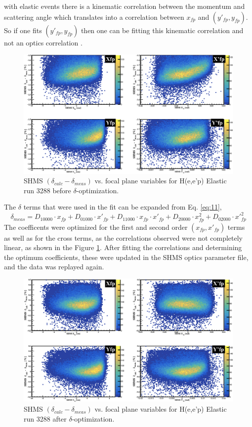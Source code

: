 \documentclass[11pt]{article}
\begin{document}
with elastic events there is a kinematic correlation between the momentum and scattering angle which translates into a correlation
between $x_{fp}$ and $(y'_{fp}, y_{fp})$. So if one fits $(y'_{fp}, y_{fp})$ then one can be fitting this kinematic
correlation and not an optics correlation \cite{priv_comm}.
\begin{figure}[h!]
  \centering
  \includegraphics[scale=0.34]{plots/SHMS_DeltaDiff_BeforeOptim3288.png}
  \caption{SHMS $(\delta_{calc}-\delta_{meas})$ vs. focal plane variables for H(e,e'p) Elastic run 3288 before $\delta$-optimization.}
  \label{fig:shmsDelta_beforeOptim}
\end{figure}
\newpage
\indent The $\delta$ terms that were used in the fit can be expanded from Eq. \ref{eq:11},
\begin{equation}
  \delta_{meas} = D_{10000}\cdot x_{fp} + D_{01000}\cdot x'_{fp} + D_{11000}\cdot x_{fp}\cdot x'_{fp} + D_{20000}\cdot x^{2}_{fp} + D_{02000}\cdot x'^{2}_{fp}
\end{equation}
The coefficents were optimized for the first and second order $(x_{fp}, x'_{fp})$ terms as well as for the cross terms, as the correlations
observed were not completely linear, as shown in the Figure \ref{fig:shmsDelta_beforeOptim}. After fitting the correlations and determining
the optimum coefficients, these were updated in the SHMS optics parameter file, and the data was replayed again.
\begin{figure}[h!]
  \centering
  \includegraphics[scale=0.34]{plots/SHMS_DeltaDiff_AfterOptim3288.png}
  \caption{SHMS $(\delta_{calc}-\delta_{meas})$ vs. focal plane variables for H(e,e'p) Elastic run 3288 after $\delta$-optimization.}
  \label{fig:shmsDelta_afterOptim}
\end{figure}\\
\end{document}
